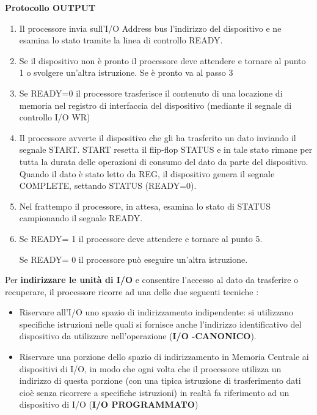 \documentclass[12pt]{article} %
\begin{document}
\newpage
\textbf{Protocollo OUTPUT}
\begin{enumerate}
    \item Il processore invia sull’I/O Address bus l’indirizzo del dispositivo e ne esamina lo stato tramite la linea di controllo READY.
    \item Se il dispositivo non è pronto il processore deve attendere e tornare al punto 1 o svolgere un’altra istruzione. Se è pronto va al passo 3
    \item Se READY=0 il processore trasferisce il contenuto di una locazione di memoria nel registro di interfaccia del dispositivo (mediante il segnale di controllo I/O WR)
    \item Il processore avverte il dispositivo che gli ha trasferito un dato inviando il segnale START. START resetta il flip-flop STATUS e in tale stato rimane per tutta la durata delle operazioni di consumo del dato da parte del dispositivo. Quando il dato è stato letto da REG, il dispositivo genera il segnale COMPLETE, settando STATUS (READY=0).
    \item Nel frattempo il processore, in attesa, esamina lo stato di STATUS campionando il segnale READY.
    \item  Se READY= 1 il processore deve attendere e tornare al punto 5.\par\medskip\noindent
    Se READY= 0 il processore può eseguire un’altra istruzione.\par\medskip\noindent
\end{enumerate}
Per \textbf{indirizzare le unità di I/O} e consentire l’accesso al dato da trasferire o recuperare, il processore ricorre ad una delle due seguenti tecniche :
\begin{itemize}
    \item Riservare all’I/O uno spazio di indirizzamento indipendente: si utilizzano specifiche istruzioni nelle quali si fornisce anche l’indirizzo identificativo del dispositivo da utilizzare nell’operazione (\textbf{I/O -CANONICO}).
    \item Riservare una porzione dello spazio di indirizzamento in Memoria Centrale ai dispositivi di I/O, in modo che ogni volta che il processore utilizza un indirizzo di questa porzione (con una tipica istruzione di trasferimento dati cioè senza ricorrere a specifiche istruzioni) in realtà fa riferimento ad un dispositivo di I/O (\textbf{I/O PROGRAMMATO})
\end{itemize}
\newpage
\end{document}
